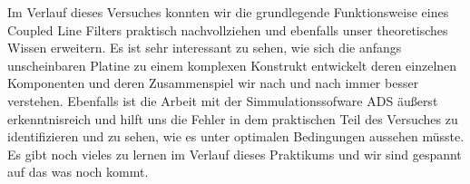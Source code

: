 
Im Verlauf dieses Versuches konnten wir die grundlegende Funktionsweise eines Coupled Line Filters praktisch nachvollziehen und ebenfalls unser theoretisches Wissen erweitern. Es ist sehr interessant zu sehen, wie sich die anfangs unscheinbaren Platine zu einem komplexen Konstrukt entwickelt deren einzelnen Komponenten und deren Zusammenspiel wir nach und nach immer besser verstehen. Ebenfalls ist die Arbeit mit der Simmulationssofware ADS äußerst erkenntnisreich und hilft uns die Fehler in dem praktischen Teil des Versuches zu identifizieren und zu sehen, wie es unter optimalen Bedingungen aussehen müsste. Es gibt noch vieles zu lernen im Verlauf dieses Praktikums und wir sind gespannt auf das was noch kommt. 
\clearpage  